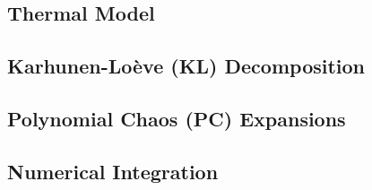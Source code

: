 \subsection{Thermal Model} 


\subsection{Karhunen-Lo\`{e}ve (KL) Decomposition} 


\subsection{Polynomial Chaos (PC) Expansions} 


\vspace{-0.5em}
\subsection{Numerical Integration} 

